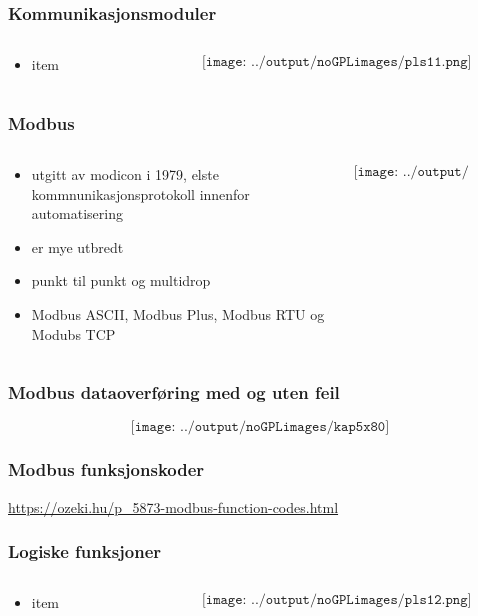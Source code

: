 \documentclass[aspectratio=169,xcolor=dvipsnames]{beamer}
\begin{document}
\begin{frame}
	\frametitle{Kommunikasjonsmoduler}
	\begin{columns}
		\begin{column}{0.5\textwidth}
			\begin{itemize}
				\item item
			\end{itemize}

			
		\end{column}

		\begin{column}{0.5\textwidth}
	$$\texttt{[image: ../output/noGPLimages/pls11.png]}$$
		\end{column}
	\end{columns}
\end{frame}
\begin{frame}
	\frametitle{Modbus}
	\begin{columns}
		\begin{column}{0.5\textwidth}

			\begin{itemize}
				\item utgitt av modicon i 1979, elste kommnunikasjonsprotokoll innenfor automatisering
				\item er mye utbredt
				\item punkt til punkt og multidrop
				\item Modbus ASCII, Modbus Plus, Modbus RTU og Modubs TCP
			\end{itemize}

			
		\end{column}

		\begin{column}{0.5\textwidth}
	$$\texttt{[image: ../output/noGPLimages/kap5x79]}$$
		\end{column}
	\end{columns}
\end{frame}
\begin{frame}
	\frametitle{Modbus dataoverføring med og uten feil}
	$$\texttt{[image: ../output/noGPLimages/kap5x80]}$$
\end{frame}
\begin{frame}
	\frametitle{Modbus funksjonskoder}

	\url{https://ozeki.hu/p_5873-modbus-function-codes.html}

\end{frame}

\begin{frame}
	\frametitle{Logiske funksjoner}
	\begin{columns}
		\begin{column}{0.5\textwidth}
			\begin{itemize}
				\item item
			\end{itemize}

			
		\end{column}

		\begin{column}{0.5\textwidth}
	$$\texttt{[image: ../output/noGPLimages/pls12.png]}$$
		\end{column}
	\end{columns}
\end{frame}
\end{document}
